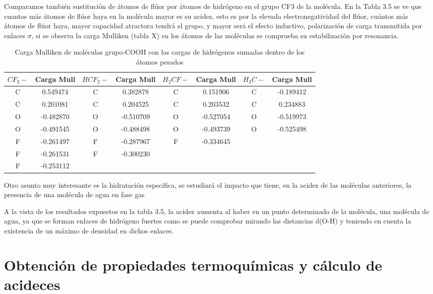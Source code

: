 Comparamos también sustitución de átomos de flúor por átomos de hidrógeno en el grupo CF3 de la molécula. En la Tabla 3.5 se ve que cuantos más átomos de flúor haya en la molécula mayor es su acidez, esto es por la elevada electronegatividad del flúor, cuántos más átomos de flúor haya, mayor capacidad atractora tendrá el grupo, y mayor será el efecto inductivo, polarización de carga transmitida por enlaces $\sigma$, si se observa la carga Mulliken (tabla X) en los átomos de las moléculas se comprueba su estabilización por resonancia.
\begin{table}[H]
    \centering
    \begin{tabular}{|c|c|c|c|c|c|c|c|}
    \hline
    $CF_3-$ & Carga Mull & $HCF_2-$ & Carga Mull & $H_2CF-$ & Carga Mull & $H_3C-$ & Carga Mull \\ \hline
     C & 0.549474 &  C & 0.382878 & C & 0.151906 & C & -0.189412 \\ \hline
     C & 0.201081 &  C & 0.204525 & C & 0.203532 & C & 0.234883 \\ \hline
     O & -0.482870 & O & -0.510709 & O & -0.527054 & O & -0.519973 \\ \hline
     O & -0.491545 & O & -0.488498 &  O & -0.493739 & O & -0.525498 \\ \hline
     F & -0.261497 & F & -0.287967 & F & -0.334645 &  & \\ \hline
     F & -0.261531 & F & -0.300230 &  &  &  & \\ \hline
     F & -0.253112 &  &  &  &  &  & \\ \hline
    \end{tabular}
    \caption{Carga Mulliken de moléculas grupo-COOH con las cargas de hidrógenos sumadas dentro de los átomos pesados}
    \label{tab:my_label}
\end{table}

Otro asunto muy interesante es la hidratación específica, se estudiará el impacto que tiene, en la acidez de las moléculas anteriores, la presencia de una molécula de agua en fase gas
 
A la vista de los resultados expuestos en la tabla 3.5, la acidez aumenta al haber en un punto determinado de la molécula, una molécula de agua, ya que se forman enlaces de hidrógeno fuertes como se puede comprobar mirando las distancias d(O-H) y teniendo en cuenta la existencia de un máximo de densidad en dichos enlaces.
 
\section{Obtención de propiedades termoquímicas y cálculo de acideces}

